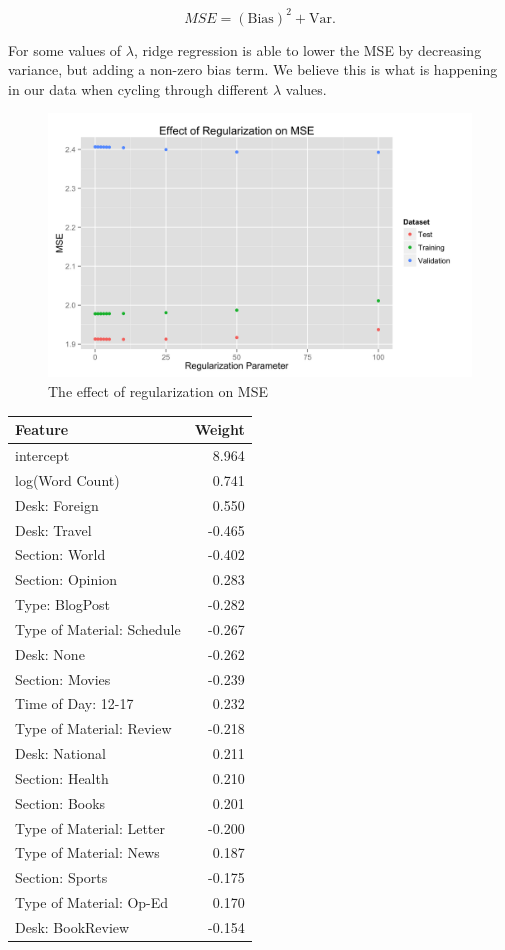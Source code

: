 \documentclass[fleqn,12pt]{SelfArx} %
\begin{document}
\begin{equation}
MSE = (\textrm{Bias})^2 + \textrm{Var}.
\end{equation}

\noindent For some values of $\lambda$, ridge regression is able to lower the MSE by decreasing variance, but adding a non-zero bias term. We believe this is what is happening in our data when cycling through different $\lambda$ values.

\begin{figure}[ht]\centering
\includegraphics[width=\linewidth]{mse_plot.png}
\caption{The effect of regularization on MSE}
\label{fig:mse_plot}
\end{figure}

\begin{center}
\begin{tabular}{lr}
\toprule
Feature  &  Weight\\
\midrule
intercept & 8.964\\
log(Word Count) & 0.741\\
Desk: Foreign & 0.550\\
Desk: Travel & -0.465\\
Section: World & -0.402\\
Section: Opinion & 0.283\\
Type: BlogPost & -0.282\\
Type of Material: Schedule & -0.267\\
Desk: None & -0.262\\
Section: Movies & -0.239\\
Time of Day: 12-17 & 0.232\\
Type of Material: Review & -0.218\\
Desk: National & 0.211\\
Section: Health & 0.210\\
Section: Books & 0.201\\
Type of Material: Letter & -0.200\\
Type of Material: News & 0.187\\
Section: Sports & -0.175\\
Type of Material: Op-Ed & 0.170\\
Desk: BookReview & -0.154\\
\end{tabular}
\end{center}
\end{document}
